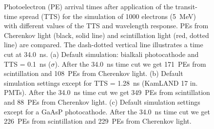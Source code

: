 \documentclass[cits]{JINST}
\begin{document}
\begin{figure}[tbh]
\begin{center}
        \caption[]{Photoelectron (PE) arrival times after application
        of the transit-time spread (TTS) for the simulation
        of 1000 electrons (5~MeV) with different values of the TTS and
        wavelength response. PEs from
        Cherenkov light (black, solid line) and scintillation light
        (red, dotted line) are
        compared. The dash-dotted vertical line illustrates a time cut at
        34.0~ns. (a) Default simulation: bialkali photocathode and TTS =
        0.1~ns ($\sigma$). After the 34.0~ns time cut we get 171~PEs
        from scintillation and 108~PEs from Cherenkov light. (b)
        Default simulation settings except for TTS = 1.28~ns (KamLAND
        17 in. PMTs). After the 34.0~ns time cut we get 349~PEs from
        scintillation and 88~PEs from Cherenkov light. (c) Default
        simulation settings except for a GaAsP photocathode. After the
        34.0~ns time cut we get 226~PEs from scintillation and 229~PEs
        from Cherenkov light. \label{time_plots_comparison}}
        \end{center}
\end{figure}
\end{document}
